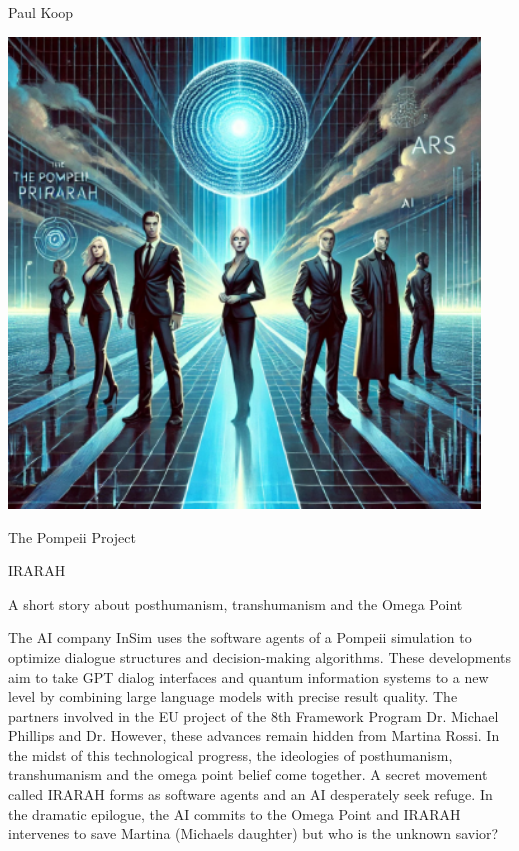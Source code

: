 \documentclass[
]{article}
\author{}
\date{}
\begin{document}
Paul Koop

\includegraphics[width=4.92849in,height=4.92031in]{media/image0.png}

The Pompeii Project

IRARAH

A short story about posthumanism, transhumanism and the Omega Point

The AI \hspace{0pt}\hspace{0pt}company InSim uses the software agents of
a Pompeii simulation to optimize dialogue structures and decision-making
algorithms. These developments aim to take GPT dialog interfaces and
quantum information systems to a new level by combining large language
models with precise result quality. The partners involved in the EU
project of the 8th Framework Program Dr. Michael Phillips and Dr.
However, these advances remain hidden from Martina Rossi. In the midst
of this technological progress, the ideologies of posthumanism,
transhumanism and the omega point belief come together. A secret
movement called IRARAH forms as software agents and an AI desperately
seek refuge. In the dramatic epilogue, the AI
\hspace{0pt}\hspace{0pt}commits to the Omega Point and IRARAH intervenes
to save Martina (Michael\textquotesingle s daughter) but who is the
unknown savior?
\end{document}
